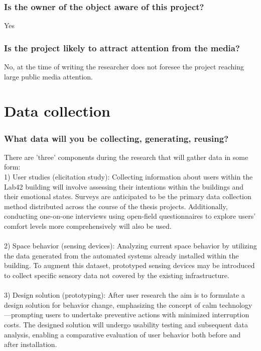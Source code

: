 \documentclass[a4paper]{article}
\begin{document}
\subsubsection{Is the owner of the object aware of this project?}
Yes

\subsubsection{Is the project likely to attract attention from the media?}
No, at the time of writing the researcher does not foresee the project reaching large public media attention.

\section{Data collection}

\subsubsection{What data will you be collecting, generating, reusing?}

There are 'three' components during the research that will gather data in some form: \\

1) User studies (elicitation study): Collecting information about users within the Lab42 building will involve assessing their intentions within the buildings and their emotional states. Surveys are anticipated to be the primary data collection method distributed across the course of the thesis projects. Additionally, conducting one-on-one interviews using open-field questionnaires to explore users’ comfort levels more comprehensively will also be used.\\\\
2) Space behavior (sensing devices): Analyzing current space behavior by utilizing the data generated from the automated systems already installed within the building. To augment this dataset, prototyped sensing devices may be introduced to collect specific sensory data not covered by the existing infrastructure.\\\\
3) Design solution (prototyping): After user research the aim is to formulate a design solution for behavior change, emphasizing the concept of calm technology—prompting users to undertake preventive actions with minimized interruption costs. The designed solution will undergo usability testing and subsequent data analysis, enabling a comparative evaluation of user behavior both before and after installation. \\
\end{document}
